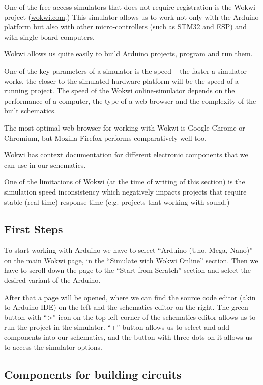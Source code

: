 \documentclass[../sparc.tex]{subfiles}
\begin{document}
One of the free-access simulators that does not require registration is the
Wokwi project (\href{https://wokwi.com/}{wokwi.com}.)  This simulator allows us
to work not only with the Arduino platform but also with other micro-controllers
(such as STM32 and ESP) and with single-board computers.

Wokwi allows us quite easily to build Arduino projects, program and run them.

One of the key parameters of a simulator is the speed -- the faster a simulator
works, the closer to the simulated hardware platform will be the speed of a
running project.  The speed of the Wokwi online-simulator depends on the
performance of a computer, the type of a web-browser and the complexity of the
built schematics.

The most optimal web-browser for working with Wokwi is Google Chrome or
Chromium, but Mozilla Firefox performs comparatively well too.

Wokwi has context documentation for different electronic components that we can
use in our schematics.

One of the limitations of Wokwi (at the time of writing of this section) is the
simulation speed inconsistency which negatively impacts projects that require
stable (real-time) response time (e.g. projects that working with sound.)

\subsection{First Steps}

To start working with Arduino we have to select ``Arduino (Uno, Mega, Nano)'' on
the main Wokwi page, in the ``Simulate with Wokwi Online'' section.  Then we
have to scroll down the page to the ``Start from Scratch'' section and select
the desired variant of the Arduino.

After that a page will be opened, where we can find the source code editor (akin
to Arduino IDE) on the left and the schematics editor on the right.  The green
button with ``>'' icon on the top left corner of the schematics editor allows us
to run the project in the simulator.  ``+'' button allows us to select and add
components into our schematics, and the button with three dots on it allows us
to access the simulator options.

\newpage
\subsection{Components for building circuits}
\end{document}
